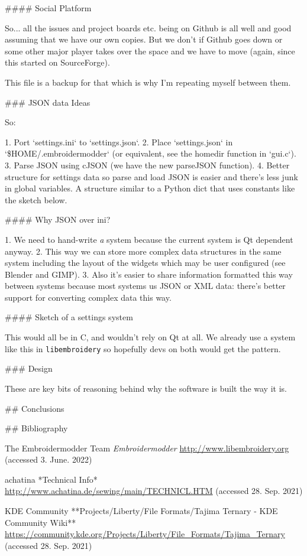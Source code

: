 #### Social Platform

So... all the issues and project boards etc. being on Github is all
well and good assuming that we have our own copies. But we don't if
Github goes down or some other major player takes over the space and we
have to move (again, since this started on SourceForge).

This file is a backup for that which is why I'm repeating myself between
them.

### JSON data Ideas

So:

1. Port `settings.ini` to `settings.json`.
2. Place `settings.json` in `\$HOME/.embroidermodder` (or equivalent, see the homedir function in `gui.c`).
3. Parse JSON using cJSON (we have the new parseJSON function).
4. Better structure for settings data so parse and load JSON is easier and there's less junk in global variables. A structure similar to a Python dict that uses constants like the sketch below.

#### Why JSON over ini?

1. We need to hand-write \emph{a} system because the current system is Qt dependent anyway.
2. This way we can store more complex data structures in the same system including the layout of the widgets which may be user configured (see Blender and GIMP).
3. Also it's easier to share information formatted this way between systems because most systems us JSON or XML data: there's better support for converting complex data this way.

#### Sketch of a settings system


This would all be in C, and wouldn't rely on Qt at all. We already use a
system like this in \texttt{libembroidery} so hopefully devs on both
would get the pattern.

### Design

These are key bits of reasoning behind why the software is built the way
it is.

## Conclusions

## Bibliography

The Embroidermodder Team \emph{Embroidermodder}
\url{http://www.libembroidery.org} (accessed 3. June. 2022)

achatina *Technical Info*
\url{http://www.achatina.de/sewing/main/TECHNICL.HTM} (accessed 28. Sep. 2021)

KDE Community
**Projects/Liberty/File Formats/Tajima Ternary - KDE Community Wiki**
\url{https://community.kde.org/Projects/Liberty/File_Formats/Tajima_Ternary}
(accessed 28. Sep. 2021)

